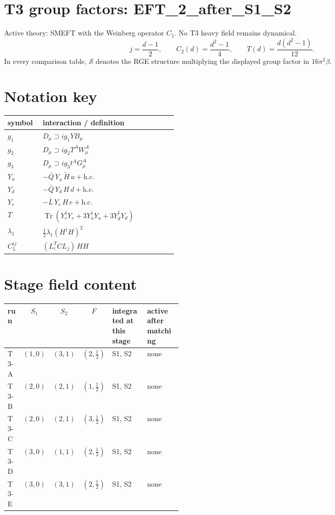 \documentclass[9pt]{article}
\begin{document}
\section*{T3 group factors: EFT\_2\_after\_S1\_S2}
Active theory: SMEFT with the Weinberg operator $C_5$.  No T3 heavy field remains dynamical.
\[j=\frac{d-1}{2},\qquad C_2(d)=\frac{d^2-1}{4},\qquad T(d)=\frac{d(d^2-1)}{12}.\]
In every comparison table, $\mathcal{S}$ denotes the RGE structure multiplying the displayed group factor in $16\pi^2\beta$.
\section*{Notation key}
\begin{longtable}{@{}p{0.19\linewidth}p{0.73\linewidth}@{}}
\toprule
symbol & interaction / definition \\
\midrule
$g_1$ & $D_\mu\supset i g_1 Y B_\mu$ \\
$g_2$ & $D_\mu\supset i g_2 T^A W_\mu^A$ \\
$g_3$ & $D_\mu\supset i g_3 t^A G_\mu^A$ \\
$Y_u$ & $-\bar Q\,Y_u\,\widetilde H\,u+\mathrm{h.c.}$ \\
$Y_d$ & $-\bar Q\,Y_d\,H\,d+\mathrm{h.c.}$ \\
$Y_e$ & $-\bar L\,Y_e\,H\,e+\mathrm{h.c.}$ \\
$T$ & $\operatorname{Tr}\!\left(Y_e^\dagger Y_e+3Y_u^\dagger Y_u+3Y_d^\dagger Y_d\right)$ \\
$\lambda_1$ & $\frac12\lambda_1(H^\dagger H)^2$ \\
$C_5^{ij}$ & $(L_i^T C L_j)\,H H$ \\
\bottomrule
\end{longtable}
\section*{Stage field content}
\begin{longtable}{@{}lccc p{0.20\linewidth}p{0.20\linewidth}@{}}
\toprule
run & $S_1$ & $S_2$ & $F$ & integrated at this stage & active after matching \\
\midrule
T3-A & $(1,0)$ & $(3,1)$ & $(2,\frac{1}{2})$ & S1, S2 & none \\
T3-B & $(2,0)$ & $(2,1)$ & $(1,\frac{1}{2})$ & S1, S2 & none \\
T3-C & $(2,0)$ & $(2,1)$ & $(3,\frac{1}{2})$ & S1, S2 & none \\
T3-D & $(3,0)$ & $(1,1)$ & $(2,\frac{1}{2})$ & S1, S2 & none \\
T3-E & $(3,0)$ & $(3,1)$ & $(2,\frac{1}{2})$ & S1, S2 & none \\
\bottomrule
\end{longtable}
\end{document}
